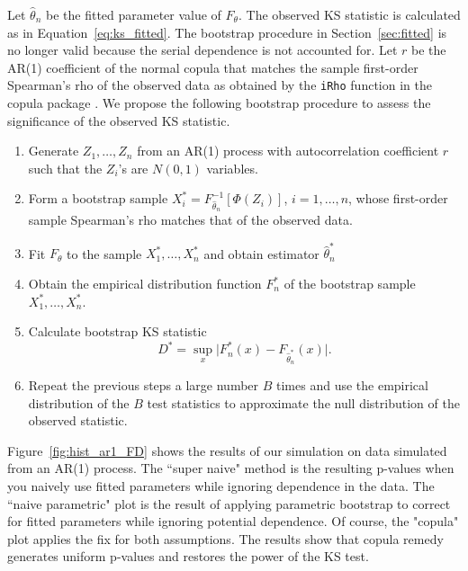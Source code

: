 \documentclass[12pt, letterpaper, titlepage]{article}
\begin{document}
Let $\hat\theta_n$ be the fitted parameter value of $F_{\theta}$. The observed
KS statistic is calculated as in Equation~\eqref{eq:ks_fitted}. The bootstrap
procedure in Section~\ref{sec:fitted} is no longer valid because the serial
dependence is not accounted for. Let $r$ be the AR(1) coefficient of the normal 
copula that matches the sample first-order Spearman's rho of the observed data 
as obtained by the \texttt{iRho} function in the \textsf{copula} package 
\citep{Copula}. We propose the following bootstrap procedure to assess the 
significance of the observed KS statistic.
\begin{enumerate}
\item
  Generate $Z_1, \ldots, Z_n$ from an AR(1) process with autocorrelation
  coefficient $r$ such that the $Z_i$'s are $N(0, 1)$ variables.
\item
  Form a bootstrap sample $X_i^* = F^{-1}_{\hat\theta_n} [\Phi(Z_i)]$,
  $i = 1, \ldots, n$, whose first-order sample Spearman's rho matches that of
  the observed data.
\item
  Fit $F_\theta$ to the sample $X_1^*, \ldots, X_n^*$ and obtain estimator 
  $\hat\theta_n^*$
\item
  Obtain the empirical distribution function $F_n^*$ of the bootstrap sample
  $X_1^*, \ldots, X_n^*$.
\item 
  Calculate bootstrap KS statistic
  \[
    D^* = \sup_x \lvert F_n^* (x)- F_{\hat\theta_n^*}(x) \rvert.
  \]
\item
  Repeat the previous steps a large number $B$ times and use the empirical
    distribution of the $B$ test statistics to approximate
    the null distribution of the observed statistic.      
\end{enumerate}

Figure~\ref{fig:hist_ar1_FD} shows the results of our simulation on data 
simulated from an AR(1) process. The ``super naive" method is the resulting 
p-values when you naively use fitted parameters while ignoring dependence in the
data. The ``naive parametric" plot is the result of applying parametric 
bootstrap to correct for fitted parameters while ignoring potential dependence. 
Of course, the "copula" plot applies the fix for both assumptions. The results 
show that copula remedy generates uniform p-values and restores the power of the
KS test.
\end{document}
